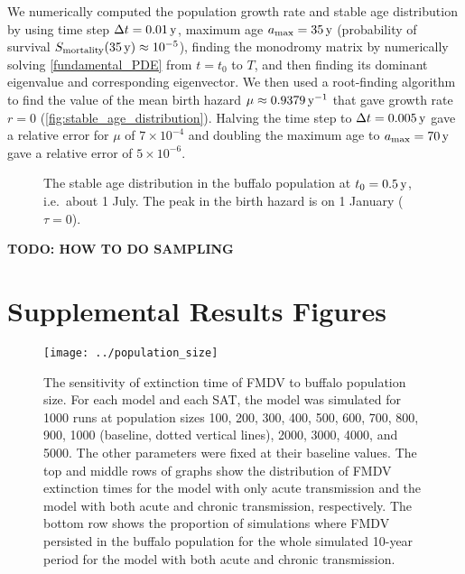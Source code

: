 \documentclass[12pt]{article}
\newcommand{\appendixlabel}{S}
\newcounter{chapter}
\renewcommand{\thechapter}{\appendixlabel\arabic{chapter}}
\renewcommand{\thefigure}{\thechapter.\arabic{figure}}
\begin{document}
We numerically computed the population growth rate and stable age
distribution by using time step $\Delta t = \unit[0.01]{y}$,
maximum age $a_{\text{max}} = \unit[35]{y}$
(probability of survival
$S_{\text{mortality}}(\unit[35]{y}) \approx 10^{-5}$),
finding the monodromy matrix by numerically solving
\eqref{fundamental_PDE} from $t = t_0$ to $T$, and
then finding its dominant eigenvalue and corresponding eigenvector.
We then used a root-finding algorithm to find the value of the mean
birth hazard $\mu \approx \unit[0.9379]{y^{-1}}$ that gave growth rate
$r = 0$ (\autoref{fig:stable_age_distribution}). Halving the time
step to $\Delta t = \unit[0.005]{y}$ gave a relative error for $\mu$
of $7 \times 10^{-4}$ and doubling the maximum age to $a_{\text{max}}
= \unit[70]{y}$ gave a relative error of $5 \times 10^{-6}$.

\begin{figure}
  \centering
  \begin{sansmath}
    
  \end{sansmath}
  \caption{The stable age distribution in the buffalo population
    at $t_0 = \unit[0.5]{y}$, i.e.~about 1 July. The peak in the birth
    hazard is on 1 January ($\tau = 0$).}
  \label{fig:stable_age_distribution}
\end{figure}

\textbf{TODO: HOW TO DO SAMPLING}


\printbibliography


\newpage
\appendix
\section*{Supplemental Results Figures}
\setcounter{figure}{\value{chapter}}
\renewcommand{\thefigure}{\appendixlabel\arabic{figure}}
\renewcommand{\HyperDestNameFilter}[1]{chapter-#1}


\begin{figure}
  \centering
  \texttt{[image: ../population\_size]}
  \caption{The sensitivity of extinction time of FMDV to buffalo
    population size.
    For each model and each SAT, the model was simulated for 1000 runs
    at population sizes 100, 200, 300, 400, 500, 600, 700, 800, 900,
    1000 (baseline, dotted vertical lines), 2000, 3000, 4000, and
    5000.
    The other parameters were fixed at their baseline values.
    The top and middle rows of graphs show the distribution of
    FMDV extinction times for the model with only acute transmission
    and the model with both acute and chronic transmission,
    respectively.
    The bottom row shows the proportion of simulations where FMDV
    persisted in the buffalo population for the whole simulated
    10-year period for the model with both acute and chronic
    transmission.}
\end{figure}
\end{document}
